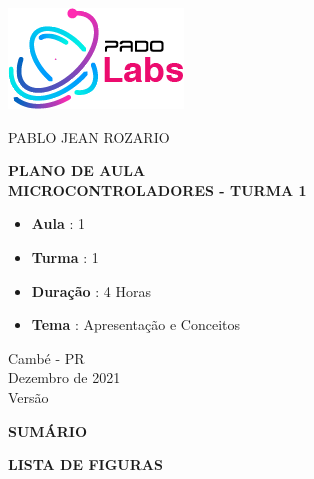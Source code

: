 \documentclass[12pt,a4paper]{report}
\begin{document}
%
%
\thispagestyle{empty}

\begin{center}
    \includegraphics[scale=0.7]{fig/logo.png}

    \vspace{.7cm}

    {\Large \uppercase{Pablo Jean Rozario}}

    \vspace{3cm}

    \Large \MakeUppercase{\textbf{PLANO DE AULA \\
            Microcontroladores - Turma 1 }}

    \vspace{3cm}

    \normalsize

    \begin{itemize}
        \item \textbf{Aula} : 1
        \item \textbf{Turma} : 1
        \item \textbf{Duração} : 4 Horas
        \item \textbf{Tema} : Apresentação e Conceitos
    \end{itemize}

    \vspace{3cm}

    Cambé - PR \\ Dezembro de 2021 \\ Versão \Revisao
\end{center}

\newpage


\thispagestyle{empty}
\mbox{}
\newpage

%
%

\begingroup
\let\clearpage\relax
\newpage
\begin{center}
    \MakeUppercase{\bf Sumário}
\end{center}
\tableofcontents
\thispagestyle{empty}

\newpage
\begin{center}
    \MakeUppercase{\bf Lista de Figuras}
\end{center}
\listoffigures
\thispagestyle{empty}
\end{document}
